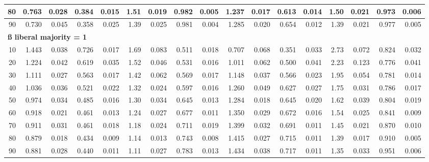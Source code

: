 \documentclass[
]{article}
\begin{document}
\begin{table}[H]
\begin{table}
{\begin{tabular}{r|r|r|r|r|r|r|r|r|r|r|r|r|r|r|r|r}
\hline
\hspace{1em}80 & 0.763 & 0.028 & 0.384 & 0.015 & 1.51 & 0.019 & 0.982 & 0.005 & 1.237 & 0.017 & 0.613 & 0.014 & 1.50 & 0.021 & 0.973 & 0.006\\
\hline
\hspace{1em}90 & 0.730 & 0.045 & 0.358 & 0.025 & 1.39 & 0.025 & 0.981 & 0.004 & 1.285 & 0.020 & 0.654 & 0.012 & 1.39 & 0.021 & 0.977 & 0.005\\
\hline
\multicolumn{17}{l}{\textbf{ß liberal majority = 1}}\\
\hline
\hspace{1em}10 & 1.443 & 0.038 & 0.726 & 0.017 & 1.69 & 0.083 & 0.511 & 0.018 & 0.707 & 0.068 & 0.351 & 0.033 & 2.73 & 0.072 & 0.824 & 0.032\\
\hline
\hspace{1em}20 & 1.224 & 0.042 & 0.619 & 0.035 & 1.52 & 0.046 & 0.531 & 0.016 & 1.011 & 0.062 & 0.500 & 0.041 & 2.23 & 0.123 & 0.776 & 0.041\\
\hline
\hspace{1em}30 & 1.111 & 0.027 & 0.563 & 0.017 & 1.42 & 0.062 & 0.569 & 0.017 & 1.148 & 0.037 & 0.566 & 0.023 & 1.95 & 0.054 & 0.781 & 0.014\\
\hline
\hspace{1em}40 & 1.036 & 0.036 & 0.521 & 0.022 & 1.32 & 0.024 & 0.597 & 0.016 & 1.260 & 0.049 & 0.627 & 0.027 & 1.75 & 0.031 & 0.786 & 0.017\\
\hline
\hspace{1em}50 & 0.974 & 0.034 & 0.485 & 0.016 & 1.30 & 0.034 & 0.645 & 0.013 & 1.284 & 0.018 & 0.645 & 0.020 & 1.62 & 0.039 & 0.804 & 0.019\\
\hline
\hspace{1em}60 & 0.918 & 0.021 & 0.461 & 0.013 & 1.24 & 0.027 & 0.677 & 0.011 & 1.350 & 0.029 & 0.672 & 0.016 & 1.54 & 0.025 & 0.841 & 0.009\\
\hline
\hspace{1em}70 & 0.911 & 0.031 & 0.461 & 0.018 & 1.18 & 0.024 & 0.711 & 0.019 & 1.399 & 0.032 & 0.691 & 0.011 & 1.45 & 0.021 & 0.870 & 0.010\\
\hline
\hspace{1em}80 & 0.879 & 0.018 & 0.434 & 0.009 & 1.14 & 0.013 & 0.743 & 0.008 & 1.415 & 0.027 & 0.715 & 0.011 & 1.39 & 0.017 & 0.910 & 0.005\\
\hline
\hspace{1em}90 & 0.881 & 0.028 & 0.440 & 0.011 & 1.11 & 0.027 & 0.783 & 0.013 & 1.434 & 0.038 & 0.717 & 0.011 & 1.35 & 0.033 & 0.951 & 0.006\\

\end{tabular}}
\end{table}
\end{table}
\end{document}
